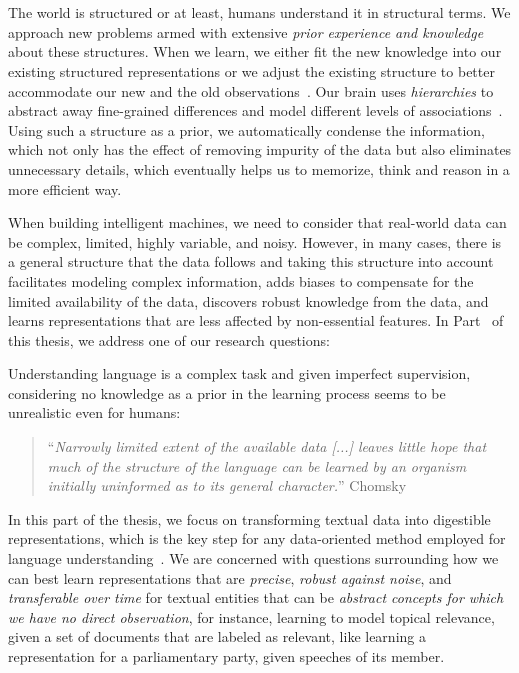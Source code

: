 \part{}
\label{part1}
%
The world is structured or at least, humans understand it in structural terms. We approach new problems armed with extensive \emph{prior experience and knowledge} about these structures. When we learn, we either fit the new knowledge into our existing structured representations or we adjust the existing structure to better accommodate our new and the old observations~\citep{battaglia2018relational}.
%
Our brain uses \emph{hierarchies} to abstract away fine-grained differences and model different levels of associations~\citep{Ballard:2015}. Using such a structure as a prior, we automatically condense the information, which not only has the effect of removing impurity of the data but also eliminates unnecessary details, which eventually helps us to memorize, think and reason in a more efficient way.

When building intelligent machines, we need to consider that real-world data can be complex, limited, highly variable, and noisy. However, in many cases, there is a general structure that the data follows and taking this structure into account facilitates modeling complex information, adds biases to compensate for the limited availability of the data, discovers robust knowledge from the data, and learns representations that are less affected by non-essential features. 
%
In Part~\ref{part1} of this thesis, we address one of our research questions:

Understanding language is a complex task and given imperfect supervision, considering no knowledge as a prior in the learning process seems to be unrealistic even for humans: 
\begin{quote}
    ``\emph{Narrowly limited extent of the available data [...] leaves little hope that much of the structure of the language can be learned by an organism initially uninformed as to its general character.}'' Chomsky~\citep{chomsky1965}
\end{quote}

In this part of the thesis, we focus on transforming textual data into digestible representations, which is the key step for any data-oriented method employed for language understanding~\citep{Bengio:2013}. 
We are concerned with questions surrounding how we can best learn representations that are \emph{precise}, \emph{robust against noise}, and \emph{transferable over time} for textual entities that can be \emph{abstract concepts for which we have no direct observation}, for instance, learning to model topical relevance, given a set of documents that are labeled as relevant, like learning a representation for a parliamentary party, given speeches of its member.


